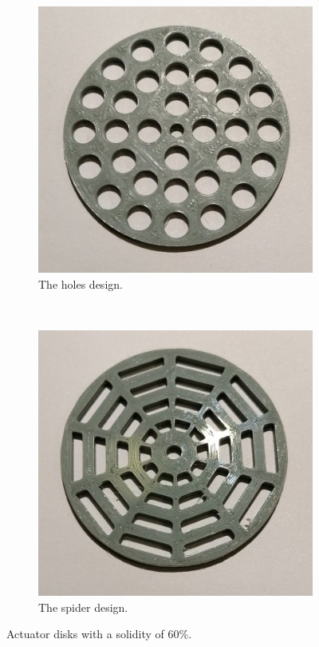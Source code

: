 \begin{figure} [h!]
    \centering
    \begin{subfigure}[b]{0.45\linewidth}
        \includegraphics[width=\textwidth]{0_Images/holes60.jpg}
        \caption{The \gls{holes} design.}
        \label{Fig:holes60}
    \end{subfigure}
    ~
    \begin{subfigure}[b]{0.45\linewidth}
        \includegraphics[width=\textwidth]{0_Images/spider60.jpg}
        \caption{The \gls{spider} design.}
        \label{Fig:spider60}
    \end{subfigure}
    \caption{Actuator disks with a solidity of 60\%.}
    \label{Fig:60Sol}
\end{figure}

